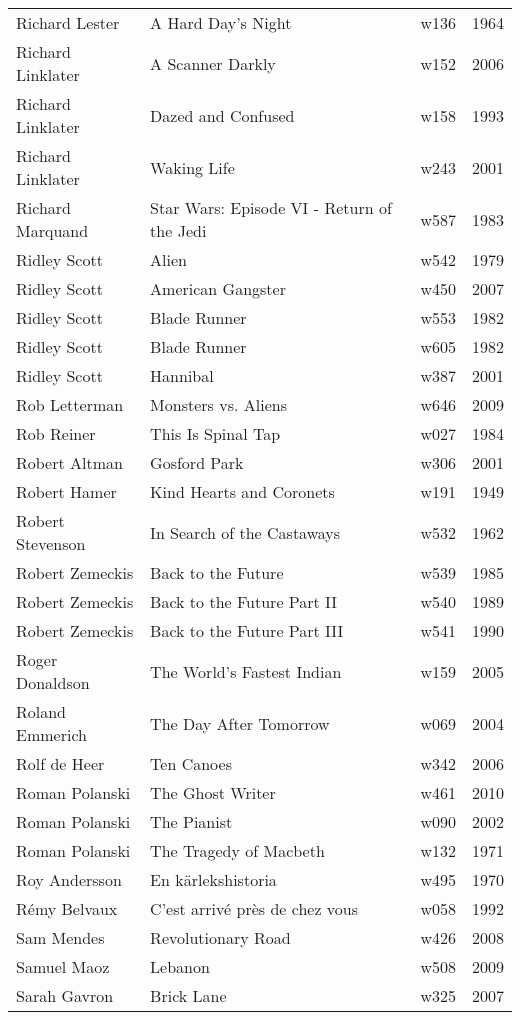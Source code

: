 \documentclass{article}
\begin{document}
\begin {center}
\begin{longtable}{l p{10cm} l l}
Richard Lester & A Hard Day's Night & w136 & 1964 \\
Richard Linklater & A Scanner Darkly & w152 & 2006 \\
Richard Linklater & Dazed and Confused & w158 & 1993 \\
Richard Linklater & Waking Life & w243 & 2001 \\
Richard Marquand & Star Wars: Episode VI - Return of the Jedi & w587 & 1983 \\
Ridley Scott & Alien & w542 & 1979 \\
Ridley Scott & American Gangster & w450 & 2007 \\
Ridley Scott & Blade Runner & w553 & 1982 \\
Ridley Scott & Blade Runner & w605 & 1982 \\
Ridley Scott & Hannibal & w387 & 2001 \\
Rob Letterman & Monsters vs. Aliens & w646 & 2009 \\
Rob Reiner & This Is Spinal Tap & w027 & 1984 \\
Robert Altman & Gosford Park & w306 & 2001 \\
Robert Hamer & Kind Hearts and Coronets & w191 & 1949 \\
Robert Stevenson & In Search of the Castaways & w532 & 1962 \\
Robert Zemeckis & Back to the Future & w539 & 1985 \\
Robert Zemeckis & Back to the Future Part II & w540 & 1989 \\
Robert Zemeckis & Back to the Future Part III & w541 & 1990 \\
Roger Donaldson & The World's Fastest Indian & w159 & 2005 \\
Roland Emmerich & The Day After Tomorrow & w069 & 2004 \\
Rolf de Heer & Ten Canoes & w342 & 2006 \\
Roman Polanski & The Ghost Writer & w461 & 2010 \\
Roman Polanski & The Pianist & w090 & 2002 \\
Roman Polanski & The Tragedy of Macbeth & w132 & 1971 \\
Roy Andersson & En kärlekshistoria & w495 & 1970 \\
Rémy Belvaux & C'est arrivé près de chez vous & w058 & 1992 \\
Sam Mendes & Revolutionary Road & w426 & 2008 \\
Samuel Maoz & Lebanon & w508 & 2009 \\
Sarah Gavron & Brick Lane & w325 & 2007 \\

\end{longtable}
\end{center}
\end{document}
